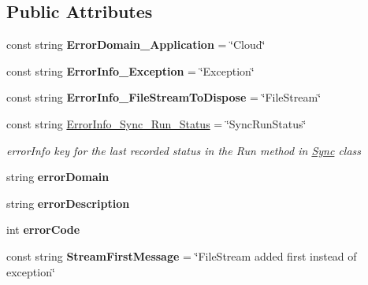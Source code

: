 \subsection*{Public Attributes}
\begin{DoxyCompactItemize}
\item 
\hypertarget{class_cloud_api_public_1_1_model_1_1_c_l_error_a426856d7b4ca111a75edaabcc7c167ba}{const string {\bfseries Error\-Domain\-\_\-\-Application} = \char`\"{}Cloud\char`\"{}}\label{class_cloud_api_public_1_1_model_1_1_c_l_error_a426856d7b4ca111a75edaabcc7c167ba}

\item 
\hypertarget{class_cloud_api_public_1_1_model_1_1_c_l_error_ac7100be19df847427ccd5c74345aad6a}{const string {\bfseries Error\-Info\-\_\-\-Exception} = \char`\"{}Exception\char`\"{}}\label{class_cloud_api_public_1_1_model_1_1_c_l_error_ac7100be19df847427ccd5c74345aad6a}

\item 
\hypertarget{class_cloud_api_public_1_1_model_1_1_c_l_error_ada50a3cbda5e6daa5f7b937d8acf88ec}{const string {\bfseries Error\-Info\-\_\-\-File\-Stream\-To\-Dispose} = \char`\"{}File\-Stream\char`\"{}}\label{class_cloud_api_public_1_1_model_1_1_c_l_error_ada50a3cbda5e6daa5f7b937d8acf88ec}

\item 
const string \hyperlink{class_cloud_api_public_1_1_model_1_1_c_l_error_a94652dc5f5c6747124cf4dded0ee17b0}{Error\-Info\-\_\-\-Sync\-\_\-\-Run\-\_\-\-Status} = \char`\"{}Sync\-Run\-Status\char`\"{}
\begin{DoxyCompactList}\small\item\em error\-Info key for the last recorded status in the Run method in \hyperlink{namespace_cloud_api_public_1_1_sync}{Sync} class \end{DoxyCompactList}\item 
\hypertarget{class_cloud_api_public_1_1_model_1_1_c_l_error_a8ecf0d21fc8589394a428ac324a1a6e9}{string {\bfseries error\-Domain}}\label{class_cloud_api_public_1_1_model_1_1_c_l_error_a8ecf0d21fc8589394a428ac324a1a6e9}

\item 
\hypertarget{class_cloud_api_public_1_1_model_1_1_c_l_error_a9c44064de990a9ed6966412ac9e42629}{string {\bfseries error\-Description}}\label{class_cloud_api_public_1_1_model_1_1_c_l_error_a9c44064de990a9ed6966412ac9e42629}

\item 
\hypertarget{class_cloud_api_public_1_1_model_1_1_c_l_error_a28253daef958732303fb02d49a0a28ed}{int {\bfseries error\-Code}}\label{class_cloud_api_public_1_1_model_1_1_c_l_error_a28253daef958732303fb02d49a0a28ed}

\item 
\hypertarget{class_cloud_api_public_1_1_model_1_1_c_l_error_a10267512ec5de04dfa5a0db4d7e94262}{const string {\bfseries Stream\-First\-Message} = \char`\"{}File\-Stream added first instead of exception\char`\"{}}\label{class_cloud_api_public_1_1_model_1_1_c_l_error_a10267512ec5de04dfa5a0db4d7e94262}

\end{DoxyCompactItemize}
